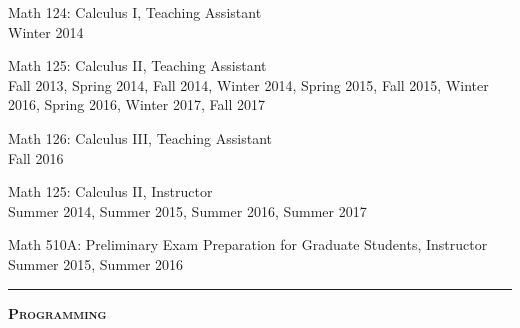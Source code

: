 \documentclass[12pt]{article}
\newcommand{\sectionheading}[1]
{
\bigskip %
\noindent
\hspace{-6.5mm}\textcolor{Gray}{\rule[.75mm]{21.5mm}{1mm}} %
\hspace{.2mm}	%
{\large{\textbf{\textsc{#1}}}} %
}
\newenvironment{date_section}
	{
	\vspace{-1ex}
	\leftmargini = 15ex
		\begin{itemize}[
			labelsep = *,
			labelwidth = 9ex,
			labelindent = 0ex,
			itemindent = !,
			font=\normalfont,
			align=parleft
		]{}
		\itemsep=-1.5mm
	}
	{\end{itemize}\vspace{-2ex}}
\newcommand{\yearmo}[2]{
	\item[
		{\makebox[1ex][r]{#1}}
		\hspace{1ex}
		{\makebox[1ex][l]{#2} }
		] }
\begin{document}
	\begin{date_section}
		
		\yearmo{}{} Math 124: Calculus I, Teaching Assistant
		\\
		Winter 2014
		
		\yearmo{}{} Math 125: Calculus II, Teaching Assistant
		\\
		Fall 2013, Spring 2014, Fall 2014, Winter 2014, Spring 2015, Fall 2015, Winter 2016, Spring 2016, Winter 2017, Fall 2017
		
		\yearmo{}{} Math 126: Calculus III, Teaching Assistant
		\\
		Fall 2016
		
		\yearmo{}{} Math 125: Calculus II, Instructor
		\\
		Summer 2014, Summer 2015, Summer 2016, Summer 2017
		
		\yearmo{}{} Math 510A: Preliminary Exam Preparation for Graduate Students, Instructor
		\\
		Summer 2015, Summer 2016
		
		
	\end{date_section}


	\sectionheading{Programming}%
	
\end{document}
